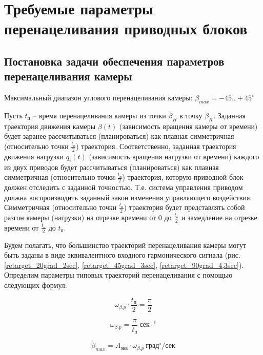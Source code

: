 \newpage
\section{Требуемые параметры перенацеливания приводных блоков}

\subsection{Постановка задачи обеспечения параметров перенацеливания камеры}

Максимальный диапазон углового перенацеливания камеры:
$\beta_{max} = -45..+45^{\circ}$

Пусть $t_\text{п}$ – время перенацеливания камеры из точки $\beta_{H}$ в точку $\beta_{K}$.
Заданная траектория движения камеры $\beta(t)$ (зависимость вращения камеры от времени) будет заранее рассчитываться (планироваться) как плавная симметричная (относительно точки $\frac{t_\text{п} }{2}$) траектория.
Соответственно, заданная траектория движения нагрузки $q_{i}(t)$ (зависимость вращения нагрузки от времени) каждого из двух приводов будет рассчитываться (планироваться) как плавная симметричная (относительно точки $\frac{t_\text{п} }{2}$) траектория, которую приводной блок должен отследить с заданной точностью.
Т.е. система управления приводом должна воспроизводить заданный закон изменения управляющего воздействия.
Симметричная (относительно точки $\frac{t_\text{п} }{2}$) траектория будет представлять собой разгон камеры (нагрузки) на отрезке времени от 0 до $\frac{t_\text{п} }{2}$ и замедление на отрезке времени от $\frac{t_\text{п} }{2}$ до $t_\text{п}$.

Будем полагать, что большинство траекторий перенацеливания камеры могут быть заданы в виде эквивалентного входного гармонического сигнала (рис. \ref{retarget_20grad_2sec}, \ref{retarget_45grad_3sec}, \ref{retarget_90grad_4,3sec}).
Определим параметры типовых траекторий перенацеливания с помощью следующих формул:

\begin{equation}
    \label{retarget_angle}
    \omega_{\beta.p} \cdot \frac{t_\text{п} }{2} = \frac{\pi}{2}
\end{equation}

\begin{equation}
    \label{equiv_signal_frequency}
    \omega_{\beta.p} = \frac{\pi}{t_\text{п} } ~\text{сек}^{-1}
\end{equation}

\begin{equation}
    \label{max_speed_for_equiv_signal}
    \dot{\beta}_{max} = A_\text{экв} \cdot \omega_{\beta.p} ~\text{град}^{\circ} / \text{сек}
\end{equation}

